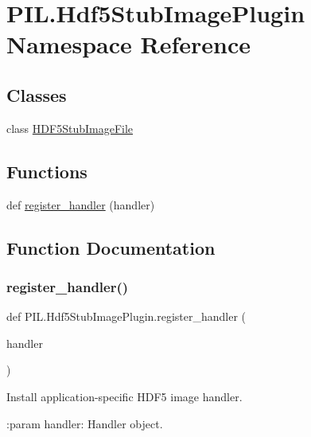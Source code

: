 \hypertarget{namespacePIL_1_1Hdf5StubImagePlugin}{}\section{P\+I\+L.\+Hdf5\+Stub\+Image\+Plugin Namespace Reference}
\label{namespacePIL_1_1Hdf5StubImagePlugin}
\subsection*{Classes}
\begin{DoxyCompactItemize}
\item 
class \hyperlink{classPIL_1_1Hdf5StubImagePlugin_1_1HDF5StubImageFile}{H\+D\+F5\+Stub\+Image\+File}
\end{DoxyCompactItemize}
\subsection*{Functions}
\begin{DoxyCompactItemize}
\item 
def \hyperlink{namespacePIL_1_1Hdf5StubImagePlugin_a40f64156ce0b6487559f3eec9f8512c5}{register\+\_\+handler} (handler)
\end{DoxyCompactItemize}


\subsection{Function Documentation}
\mbox{\label{namespacePIL_1_1Hdf5StubImagePlugin_a40f64156ce0b6487559f3eec9f8512c5}} 
\subsubsection{\texorpdfstring{register\+\_\+handler()}{register\_handler()}}
{\footnotesize\ttfamily def P\+I\+L.\+Hdf5\+Stub\+Image\+Plugin.\+register\+\_\+handler (\begin{DoxyParamCaption}\item[{}]{handler }\end{DoxyParamCaption})}

\begin{DoxyVerb}Install application-specific HDF5 image handler.

:param handler: Handler object.
\end{DoxyVerb}
 